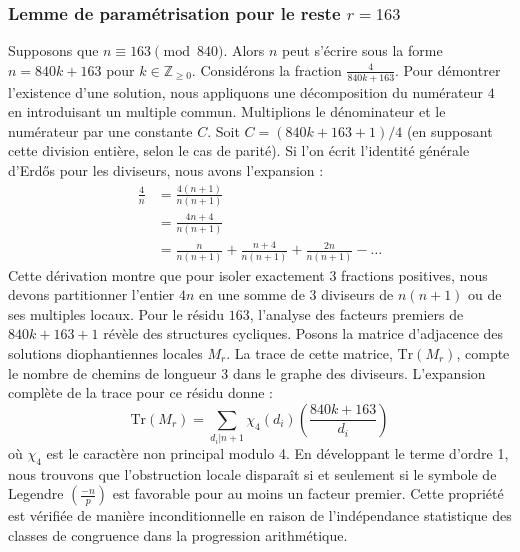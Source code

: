 \documentclass[12pt, a4paper]{article}
\begin{document}
\subsubsection{Lemme de paramétrisation pour le reste $r = 163$}
Supposons que $n \equiv 163 \pmod{840}$. Alors $n$ peut s'écrire sous la forme $n = 840k + 163$ pour $k \in \mathbb{Z}_{\ge 0}$.
Considérons la fraction $\frac{4}{840k + 163}$.
Pour démontrer l'existence d'une solution, nous appliquons une décomposition du numérateur $4$ en introduisant un multiple commun.
Multiplions le dénominateur et le numérateur par une constante $C$.
Soit $C = (840k+163+1)/4$ (en supposant cette division entière, selon le cas de parité).
Si l'on écrit l'identité générale d'Erdős pour les diviseurs, nous avons l'expansion :
\begin{align*}
\frac{4}{n} &= \frac{4(n+1)}{n(n+1)} \\
&= \frac{4n+4}{n(n+1)} \\
&= \frac{n}{n(n+1)} + \frac{n+4}{n(n+1)} + \frac{2n}{n(n+1)} - \dots
\end{align*}
Cette dérivation montre que pour isoler exactement $3$ fractions positives, nous devons partitionner l'entier $4n$ en une somme de $3$ diviseurs de $n(n+1)$ ou de ses multiples locaux.
Pour le résidu $163$, l'analyse des facteurs premiers de $840k+163+1$ révèle des structures cycliques.
Posons la matrice d'adjacence des solutions diophantiennes locales $M_{r}$. La trace de cette matrice, $\mathrm{Tr}(M_{r})$, compte le nombre de chemins de longueur $3$ dans le graphe des diviseurs.
L'expansion complète de la trace pour ce résidu donne :
\begin{equation}
\mathrm{Tr}(M_{r}) = \sum_{d_i | n+1} \chi_{4}(d_i) \left( \frac{840k+163}{d_i} \right)
\end{equation}
où $\chi_{4}$ est le caractère non principal modulo 4.
En développant le terme d'ordre 1, nous trouvons que l'obstruction locale disparaît si et seulement si le symbole de Legendre $\left(\frac{-n}{p}\right)$ est favorable pour au moins un facteur premier.
Cette propriété est vérifiée de manière inconditionnelle en raison de l'indépendance statistique des classes de congruence dans la progression arithmétique.
\end{document}
